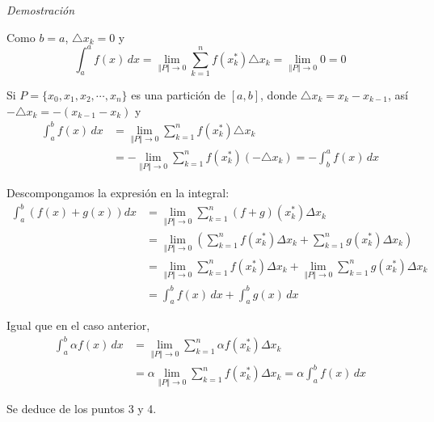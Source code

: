 \textit{Demostración}
\begin{parrafonumerado}
\item Como $b=a$, $\triangle x_{k}=0$ y
\[
\int_{a}^{a}f\left( x\right)\,dx=\underset{\left\Vert P\right\Vert
\rightarrow 0}{\lim }\sum_{k=1}^{n}f(x_{k}^{\ast
})\triangle x_{k}=\underset{\left\Vert P\right\Vert \rightarrow 0}{\lim }0=0
\]

\item Si $P=\{x_{0},x_{1},x_{2},\cdots ,x_{n}\}$ es una partición de $\left[a,b\right]$, donde $\triangle x_{k}=x_{k}-x_{k-1}$, así $-\triangle x_{k}=-\left( x_{k-1}-x_{k}\right)$ y
\begin{align*}
\int_{a}^{b}f\left( x\right)\,dx&=\underset{\left\Vert P\right\Vert
\rightarrow 0}{\lim }\sum_{k=1}^{n}f(x_{k}^{\ast
})\triangle x_{k}\\
&=-\underset{\left\Vert P\right\Vert \rightarrow 0}{\lim }
\sum_{k=1}^{n}f(x_{k}^{\ast })\left( -\triangle
x_{k}\right) =-\int_{b}^{a}f\left( x\right)\,dx
\end{align*}

\item Descompongamos la expresión en la integral:
\begin{align*}
\int_{a}^{b}\left( f(x)+g(x)\right) dx&=\underset{\left\Vert
P\right\Vert \rightarrow 0}{\lim }\sum_{k=1}^{n}\left(
f+g\right) (x_{k}^{\ast })\Delta x_{k}\\
&=\underset{\left\Vert P\right\Vert
\rightarrow 0}{\lim }\left( \sum_{k=1}^{n}f(x_{k}^{\ast
  })\Delta x_{k}+\sum_{k=1}^{n}g(x_{k}^{\ast
})\Delta x_{k}\right)\\
&=\underset{\left\Vert P\right\Vert
\rightarrow 0}{\lim }\sum_{k=1}^{n}f(x_{k}^{\ast
})\Delta x_{k}+\underset{\left\Vert P\right\Vert \rightarrow 0}{\lim }%
\sum_{k=1}^{n}g(x_{k}^{\ast })\Delta x_{k}\\
&=\int_{a}^{b}f(x)\,dx+\int_{a}^{b}g(x)\,dx
\end{align*}

\item Igual que en el caso anterior,
\begin{align*}
\int_{a}^{b}\alpha f(x)\,dx&=\underset{\left\Vert P\right\Vert \rightarrow 0%
}{\lim }\sum_{k=1}^{n}\alpha f(x_{k}^{\ast })\Delta
x_{k}\\
&=\alpha \underset{\left\Vert P\right\Vert \rightarrow 0%
}{\lim }\sum_{k=1}^{n}f(x_{k}^{\ast })\Delta x_{k}
=\alpha \int_{a}^{b}f(x)\,dx
\end{align*}

\item Se deduce de los puntos 3 y 4.


\end{parrafonumerado}
